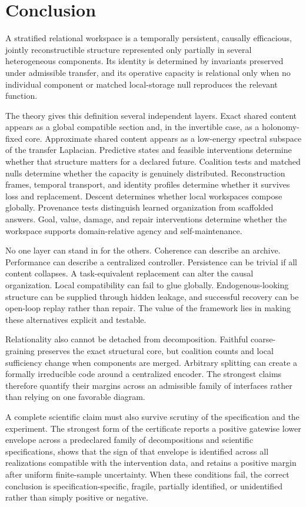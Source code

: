 \section{Conclusion}

A stratified relational workspace is a temporally persistent, causally efficacious, jointly reconstructible
structure represented only partially in several heterogeneous components. Its identity is determined by
invariants preserved under admissible transfer, and its operative capacity is relational only when no
individual component or matched local-storage null reproduces the relevant function.

The theory gives this definition several independent layers. Exact shared content appears as a global
compatible section and, in the invertible case, as a holonomy-fixed core. Approximate shared content
appears as a low-energy spectral subspace of the transfer Laplacian. Predictive states and feasible
interventions determine whether that structure matters for a declared future. Coalition tests and matched
nulls determine whether the capacity is genuinely distributed. Reconstruction frames, temporal transport,
and identity profiles determine whether it survives loss and replacement. Descent determines whether
local workspaces compose globally. Provenance tests distinguish learned organization from scaffolded
answers. Goal, value, damage, and repair interventions determine whether the workspace supports
domain-relative agency and self-maintenance.

No one layer can stand in for the others. Coherence can describe an archive. Performance can describe a
centralized controller. Persistence can be trivial if all content collapses. A task-equivalent replacement
can alter the causal organization. Local compatibility can fail to glue globally. Endogenous-looking
structure can be supplied through hidden leakage, and successful recovery can be open-loop replay rather
than repair. The value of the framework lies in making these alternatives explicit and testable.


Relationality also cannot be detached from decomposition. Faithful
coarse-graining preserves the exact structural core, but coalition counts and
local sufficiency change when components are merged. Arbitrary splitting can
create a formally irreducible code around a centralized encoder. The strongest
claims therefore quantify their margins across an admissible family of
interfaces rather than relying on one favorable diagram.

A complete scientific claim must also survive scrutiny of the specification and the experiment.
The strongest form of the certificate reports a positive gatewise lower envelope across a predeclared
family of decompositions and scientific specifications, shows that the sign of that envelope is identified
across all realizations compatible with the intervention data, and retains a positive margin after uniform
finite-sample uncertainty. When these conditions fail, the correct conclusion is specification-specific,
fragile, partially identified, or unidentified rather than simply positive or negative.

